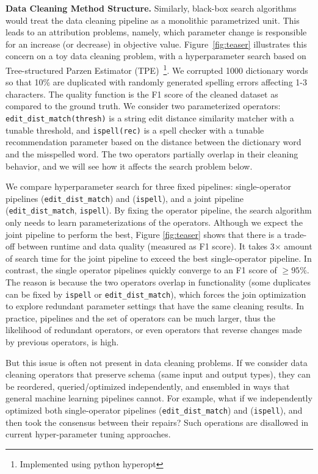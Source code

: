 \vspace{0.5em}
\noindent \textbf{Data Cleaning Method Structure. } Similarly, black-box search algorithms would treat the data cleaning pipeline as a monolithic parametrized unit.
This leads to an attribution problems, namely, which parameter change is responsible for an increase (or decrease) in objective value.
Figure~\ref{fig:teaser} illustrates this concern on a toy data cleaning problem, with a hyperparameter search based on Tree-structured Parzen Estimator (TPE)~\cite{shahriari2016taking}\footnote{Implemented using \textsf{python hyperopt}}.  We corrupted 1000 dictionary words so that 10\% are duplicated with randomly generated spelling errors affecting 1-3 characters. The quality function is the F1 score of the cleaned dataset as compared to the ground truth.  We consider two parameterized operators: \texttt{edit\_dist\_match(thresh)} is a string edit distance similarity matcher with a tunable threshold, and \texttt{ispell(rec)} is a spell checker with a tunable recommendation parameter based on the distance between the dictionary word and the misspelled word.  The two operators partially overlap in their cleaning behavior, and we will see how it affects the search problem below.   

We compare hyperparameter search for three fixed pipelines:  single-operator pipelines (\texttt{edit\_dist\_match}) and (\texttt{ispell}), and a joint pipeline (\texttt{edit\_dist\_match}, \texttt{ispell}).  By fixing the operator pipeline, the search algorithm only needs to learn parameterizations of the operators.  Although we expect the joint pipeline to perform the best, Figure \ref{fig:teaser} shows that there is a trade-off between runtime and data quality (measured as F1 score).  It takes 3$\times$ amount of search time for the joint pipeline to exceed the best single-operator pipeline.    In contrast, the single operator pipelines quickly converge to an F1 score of $\ge95\%$.  The reason is because the two operators overlap in functionality (some duplicates can be fixed by \texttt{ispell} or \texttt{edit\_dist\_match}), which forces the join optimization to explore redundant parameter settings that have the same cleaning results.  In practice, pipelines and the set of operators can be much larger, thus the likelihood of redundant operators, or even operators that reverse changes made by previous operators, is high.

But this issue is often not present in data cleaning problems.
If we consider data cleaning operators that preserve schema (same input and output types), they can be reordered, queried/optimized independently, and ensembled in ways that general machine learning pipelines cannot.
For example, what if we independently optimized both single-operator pipelines (\texttt{edit\_dist\_match}) and (\texttt{ispell}), and then took the consensus between their repairs?
Such operations are disallowed in current hyper-parameter tuning approaches.

